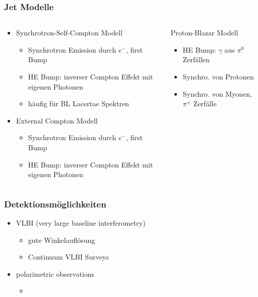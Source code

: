 \documentclass[aspectratio=1610, 9pt]{beamer}
\begin{document}
\begin{frame}\frametitle{Jet Modelle}
  \begin{columns}
  \begin{column}[c]{0.45\linewidth}
  \begin{itemize}
    \item Synchrotron-Self-Compton Modell
    \begin{itemize}
      \item Synchrotron Emission durch $e^{-}$, first Bump
      \item HE Bump: inverser Compton Effekt mit eigenen Photonen
      \item h\"aufig f\"ur BL Lacertae Spektren
    \end{itemize}
    \item External Compton Modell
    \begin{itemize}
      \item Synchrotron Emission durch $e^{-}$, first Bump
      \item HE Bump: inverser Compton Effekt mit eigenen Photonen
    \end{itemize}
  \end{itemize}
  \end{column}
  \begin{column}{0.45\linewidth}
    \begin{block}{Proton-Blazar Modell}
    \begin{itemize}
      \item HE Bump: $\gamma$ aus $\pi^{0}$ Zerf\"allen
      \item Synchro. von Protonen
      \item Synchro. von Myonen, $\pi^{\pm}$ Zerf\"alle
    \end{itemize}
    \end{block}
  \end{column}
  \end{columns}
\end{frame}

\begin{frame}\frametitle{Detektionsm\"oglichkeiten}
  \begin{itemize}
    \item VLBI (very large baseline interferometry)
    \begin{itemize}
      \item gute Winkelaufl\"osung
      \item Continuum VLBI Surveys
    \end{itemize}
    \item polarimetric observations
    \begin{itemize}
      \item 
    \end{itemize}
  \end{itemize}
\end{frame}
\end{document}
